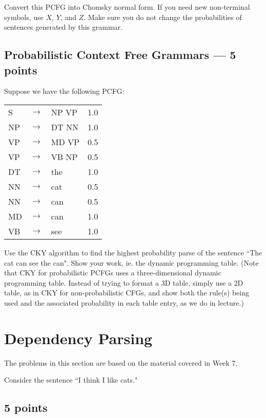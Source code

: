 \documentclass[12pt,a4paper]{article}
\begin{document}
Convert this PCFG into Chomsky normal form. If you need new non-terminal symbols, use $X$, $Y$, and $Z$. Make sure you do not change the probabilities of sentences generated by this grammar.

\subsection{Probabilistic Context Free Grammars --- 5 points}

Suppose we have the following PCFG:

\begin{center}
\begin{tabular}{l c l l}
S & $\rightarrow$ & NP VP & 1.0 \\
NP & $\rightarrow$ & DT NN & 1.0 \\
VP & $\rightarrow$ & MD VP & 0.5 \\
VP & $\rightarrow$ & VB NP & 0.5 \\
DT & $\rightarrow$ & the & 1.0 \\
NN & $\rightarrow$ & cat & 0.5 \\
NN & $\rightarrow$ & can & 0.5 \\
MD & $\rightarrow$ & can & 1.0 \\
VB & $\rightarrow$ & see & 1.0 \\
\end{tabular}
\end{center}

Use the CKY algorithm to find the highest probability parse of the sentence ``The cat can see the can". Show your work, ie. the dynamic programming table. (Note that CKY for probabilistic PCFGs uses a three-dimensional dynamic programming table. Instead of trying to format a 3D table, simply use a 2D table, as in CKY for non-probabilistic CFGs, and show both the rule(s) being used and the associated probability in each table entry, as we do in lecture.)

\section{Dependency Parsing}

The problems in this section are based on the material covered in Week 7.

\vspace{\baselineskip}

Consider the sentence ``I think I like cats."

\subsection{5 points}
\end{document}
